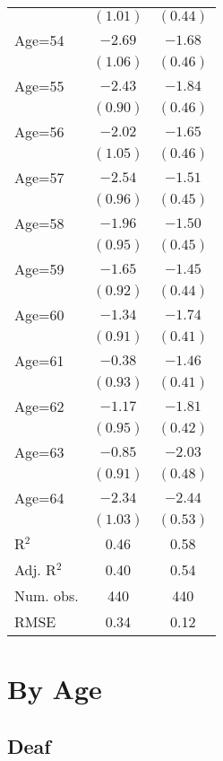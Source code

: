 \documentclass[fullpage]{paper}
\begin{document}
\begin{center}
\begin{longtable}{l c c }
            & $(1.01)$ & $(0.44)$ \\
Age=54      & $-2.69$  & $-1.68$  \\
            & $(1.06)$ & $(0.46)$ \\
Age=55      & $-2.43$  & $-1.84$  \\
            & $(0.90)$ & $(0.46)$ \\
Age=56      & $-2.02$  & $-1.65$  \\
            & $(1.05)$ & $(0.46)$ \\
Age=57      & $-2.54$  & $-1.51$  \\
            & $(0.96)$ & $(0.45)$ \\
Age=58      & $-1.96$  & $-1.50$  \\
            & $(0.95)$ & $(0.45)$ \\
Age=59      & $-1.65$  & $-1.45$  \\
            & $(0.92)$ & $(0.44)$ \\
Age=60      & $-1.34$  & $-1.74$  \\
            & $(0.91)$ & $(0.41)$ \\
Age=61      & $-0.38$  & $-1.46$  \\
            & $(0.93)$ & $(0.41)$ \\
Age=62      & $-1.17$  & $-1.81$  \\
            & $(0.95)$ & $(0.42)$ \\
Age=63      & $-0.85$  & $-2.03$  \\
            & $(0.91)$ & $(0.48)$ \\
Age=64      & $-2.34$  & $-2.44$  \\
            & $(1.03)$ & $(0.53)$ \\
\hline
R$^2$       & 0.46     & 0.58     \\
Adj. R$^2$  & 0.40     & 0.54     \\
Num. obs.   & 440      & 440      \\
RMSE        & 0.34     & 0.12     \\
\end{longtable}
\end{center}
\section{ By Age }

\subsection{ Deaf }
\end{document}
